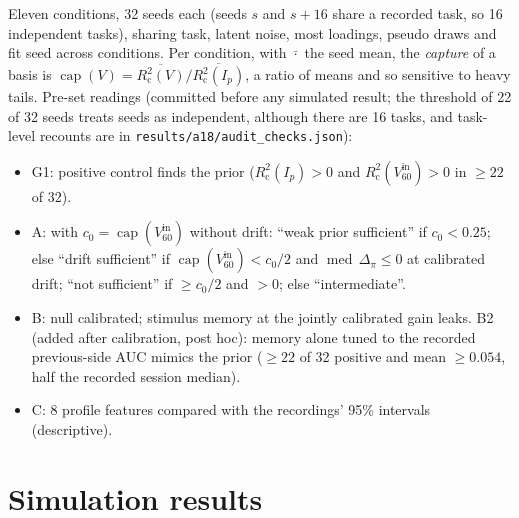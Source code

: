 \documentclass[11pt]{article}
\newcommand{\med}{\operatorname{med}}
\newcommand{\Rc}{R^2_{\mathrm{c}}}
\begin{document}
Eleven conditions, 32 seeds each (seeds $s$ and $s+16$ share a recorded task, so 16 independent tasks), sharing task,
latent noise, most loadings, pseudo draws and fit seed across conditions. Per condition, with $\bar{\cdot}$ the seed
mean, the \emph{capture} of a basis is $\operatorname{cap}(V) = \overline{\Rc(V)} / \overline{\Rc(I_p)}$, a ratio of
means and so sensitive to heavy tails. Pre-set readings (committed before any simulated result; the threshold of 22 of
32 seeds treats seeds as independent, although there are 16 tasks, and task-level recounts are in
\texttt{results/a18/audit\_checks.json}):
\begin{itemize}
\item G1: positive control finds the prior ($\Rc(I_p) > 0$ and $\Rc(V^{\mathrm{in}}_{60}) > 0$ in $\ge 22$ of 32).
\item A: with $c_0 = \operatorname{cap}(V^{\mathrm{in}}_{60})$ without drift: ``weak prior sufficient'' if $c_0 < 0.25$;
  else ``drift sufficient'' if $\operatorname{cap}(V^{\mathrm{in}}_{60}) < c_0/2$ and $\med\,\Delta_\pi \le 0$ at
  calibrated drift; ``not sufficient'' if $\ge c_0/2$ and $> 0$; else ``intermediate''.
\item B: null calibrated; stimulus memory at the jointly calibrated gain leaks. B2 (added after calibration, post hoc):
  memory alone tuned to the recorded previous-side AUC mimics the prior ($\ge 22$ of 32 positive and mean
  $\ge 0.054$, half the recorded session median).
\item C: 8 profile features compared with the recordings' 95\% intervals (descriptive).
\end{itemize}

\section{Simulation results}
\label{sec:simres}
\end{document}
